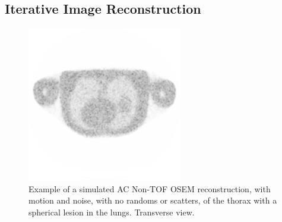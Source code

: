        \subsection{Iterative Image Reconstruction} \label{sec:iterative_image_reconstruction}
            \begin{figure}
                \centering
                
                \includegraphics[width=1.0\linewidth]{figures/background_osem_example.png}
                
                \captionsetup{singlelinecheck=false}
                \caption{
                    Example of a simulated \gls{AC} \gls{Non-TOF} \gls{OSEM} reconstruction, with motion and noise, with no randoms or scatters, of the thorax with a spherical lesion in the lungs. Transverse view.
                }
                \label{fig:iterative_image_reconstruction_osem_example}
            \end{figure}
            

